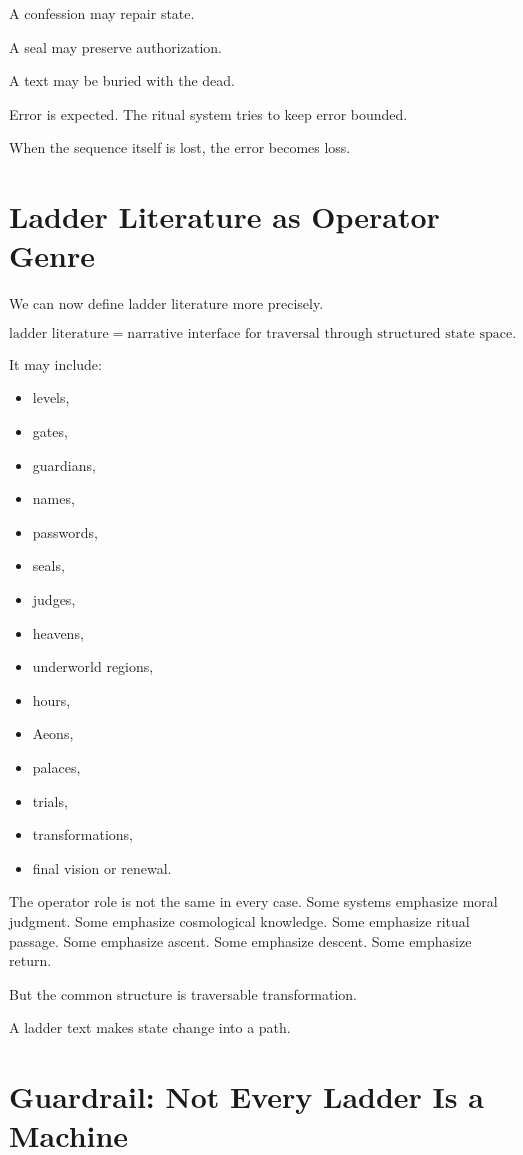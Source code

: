 \documentclass[11pt]{book}
\begin{document}
A confession may repair state.

A seal may preserve authorization.

A text may be buried with the dead.

Error is expected. The ritual system tries to keep error bounded.

When the sequence itself is lost, the error becomes loss.

\section{Ladder Literature as Operator Genre}

We can now define ladder literature more precisely.

\[
\text{ladder literature} = \text{narrative interface for traversal through structured state space}.
\]

It may include:

\begin{itemize}
    \item levels,
    \item gates,
    \item guardians,
    \item names,
    \item passwords,
    \item seals,
    \item judges,
    \item heavens,
    \item underworld regions,
    \item hours,
    \item Aeons,
    \item palaces,
    \item trials,
    \item transformations,
    \item final vision or renewal.
\end{itemize}

The operator role is not the same in every case. Some systems emphasize moral judgment. Some emphasize cosmological knowledge. Some emphasize ritual passage. Some emphasize ascent. Some emphasize descent. Some emphasize return.

But the common structure is traversable transformation.

A ladder text makes state change into a path.

\section{Guardrail: Not Every Ladder Is a Machine}
\end{document}
